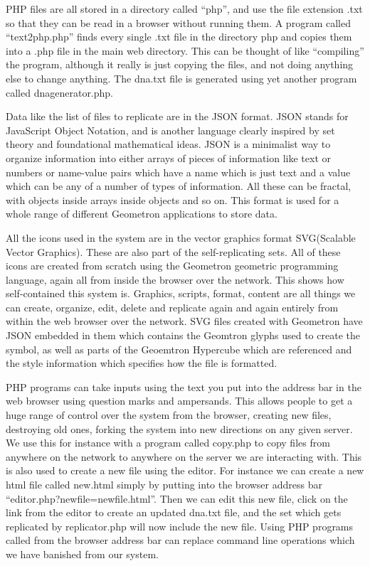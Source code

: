 PHP files are all stored in a directory called ``php'', and use the file
extension .txt so that they can be read in a browser without running
them. A program called ``text2php.php'' finds every single .txt file in
the directory php and copies them into a .php file in the main web
directory. This can be thought of like ``compiling'' the program,
although it really is just copying the files, and not doing anything
else to change anything. The dna.txt file is generated using yet another
program called dnagenerator.php.

Data like the list of files to replicate are in the JSON format. JSON
stands for JavaScript Object Notation, and is another language clearly
inspired by set theory and foundational mathematical ideas. JSON is a
minimalist way to organize information into either arrays of pieces of
information like text or numbers or name-value pairs which have a name
which is just text and a value which can be any of a number of types of
information. All these can be fractal, with objects inside arrays inside
objects and so on. This format is used for a whole range of different
Geometron applications to store data.

All the icons used in the system are in the vector graphics format
SVG(Scalable Vector Graphics). These are also part of the
self-replicating sets. All of these icons are created from scratch using
the Geometron geometric programming language, again all from inside the
browser over the network. This shows how self-contained this system is.
Graphics, scripts, format, content are all things we can create,
organize, edit, delete and replicate again and again entirely from
within the web browser over the network. SVG files created with
Geometron have JSON embedded in them which contains the Geomtron glyphs
used to create the symbol, as well as parts of the Geoemtron Hypercube
which are referenced and the style information which specifies how the
file is formatted.

PHP programs can take inputs using the text you put into the address bar
in the web browser using question marks and ampersands. This allows
people to get a huge range of control over the system from the browser,
creating new files, destroying old ones, forking the system into new
directions on any given server. We use this for instance with a program
called copy.php to copy files from anywhere on the network to anywhere
on the server we are interacting with. This is also used to create a new
file using the editor. For instance we can create a new html file called
new.html simply by putting into the browser address bar
``editor.php?newfile=newfile.html''. Then we can edit this new file,
click on the link from the editor to create an updated dna.txt file, and
the set which gets replicated by replicator.php will now include the new
file. Using PHP programs called from the browser address bar can replace
command line operations which we have banished from our system.

